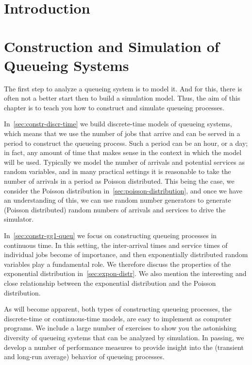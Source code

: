 \chapter{Introduction}
\label{cha:introduction}


\clearpage



\mainmatter

\chapter{Construction and Simulation of Queueing Systems}
\label{cha:single-stat-queu}


The first step to analyze a queueing system is to model it.
And for this, there is often not a better start then to build a simulation model.
Thus, the aim of this chapter is to teach you how to construct and simulate queueing processes.

In~\cref{sec:constr-discr-time} we build discrete-time models of queueing systems, which means that we use the number of jobs that arrive and can be served in a period to construct the queueing process.
Such a period can be an hour, or a day; in fact, any amount of time that makes sense in the context in which the model will be used.
Typically we model the number of arrivals and potential services as random variables, and in many practical settings it is reasonable to take the number of arrivals in a period as Poisson distributed.
This being the case, we consider the Poisson distribution in~\cref{sec:poisson-distribution}, and once we have an understanding of this, we can use random number generators to generate (Poisson distributed) random numbers of arrivals and services to drive the simulator.


In~\cref{sec:constr-gg1-queu} we focus on constructing queueing processes in continuous time.
In this setting, the inter-arrival times and service times of individual jobs become of importance, and then exponentially distributed random variables play a fundamental role.
We therefore discuss the properties of the exponential distribution in~\cref{sec:expon-distr}.
We also mention the interesting and close relationship between the exponential distribution and the Poisson distribution.

As will become apparent, both types of constructing queueing processes, the discrete-time or continuous-time models, are easy to implement as computer programs.
We include a large number of exercises to show you the astonishing diversity of queueing systems that can be analyzed by simulation.
In passing, we develop a number of performance measures to provide insight into the (transient and long-run average) behavior of queueing processes.

